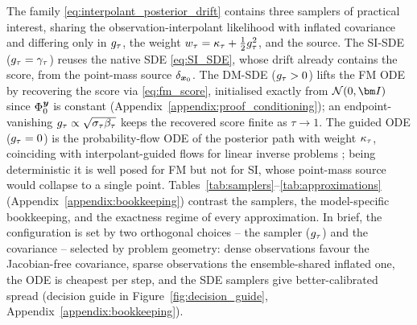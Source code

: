 The family \eqref{eq:interpolant_posterior_drift} contains three samplers of practical interest, sharing the observation-interpolant likelihood with inflated covariance and differing only in $g_\tau$, the weight $w_\tau=\kappa_\tau+\tfrac12g_\tau^2$, and the source. The SI-SDE ($g_\tau=\gamma_\tau$) reuses the native SDE \eqref{eq:SI_SDE}, whose drift already contains the score, from the point-mass source $\delta_{\boldsymbol{x}_0}$. The DM-SDE ($g_\tau>0$) lifts the FM ODE by recovering the score via \eqref{eq:fm_score}, initialised exactly from $\mathcal{N}(0,\bI)$ since $\Phi_0^{\boldsymbol{y}}$ is constant (Appendix~\ref{appendix:proof_conditioning}); an endpoint-vanishing $g_\tau\propto\sqrt{\sigma_\tau\beta_\tau}$ keeps the recovered score finite as $\tau\to1$. The guided ODE ($g_\tau=0$) is the probability-flow ODE of the posterior path with weight $\kappa_\tau$, coinciding with interpolant-guided flows for linear inverse problems \cite{yan_fig_2024, pokle_training-free_2024}; being deterministic it is well posed for FM but not for SI, whose point-mass source would collapse to a single point. Tables~\ref{tab:samplers}--\ref{tab:approximations} (Appendix~\ref{appendix:bookkeeping}) contrast the samplers, the model-specific bookkeeping, and the exactness regime of every approximation. In brief, the configuration is set by two orthogonal choices -- the sampler ($g_\tau$) and the covariance -- selected by problem geometry: dense observations favour the Jacobian-free covariance, sparse observations the ensemble-shared inflated one, the ODE is cheapest per step, and the SDE samplers give better-calibrated spread (decision guide in Figure~\ref{fig:decision_guide}, Appendix~\ref{appendix:bookkeeping}).
